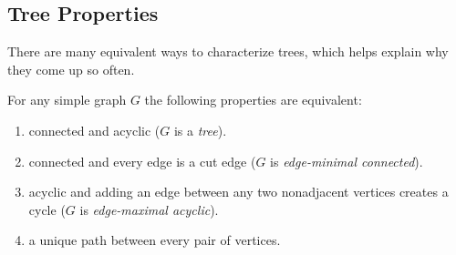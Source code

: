 \subsection{Tree Properties}

There are many equivalent ways to characterize trees, which helps
explain why they come up so often.

\begin{theorem}\label{th:treeprops}
For any simple graph $G$ the following properties are equivalent:

\begin{enumerate}[(1)]

\item\label{isatree} connected and acyclic ($G$ is a \emph{tree}).

\item\label{minconnect} connected and every edge is a cut edge ($G$ is
  \emph{edge-minimal connected}).

\item\label{maxacyclic} acyclic and adding an edge between any two nonadjacent
  vertices creates a cycle ($G$ is \emph{edge-maximal acyclic}).

\item\label{uniquepath} a unique path between every pair of
  vertices.

\end{enumerate}

\end{theorem}


